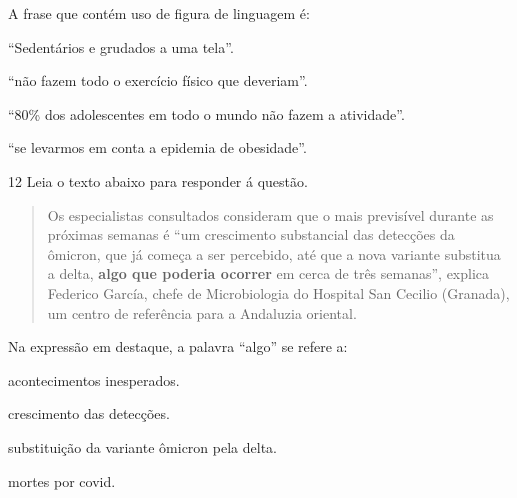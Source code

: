 
A frase que contém uso de figura de linguagem é:

\begin{escolha}
    
    \item ``Sedentários e grudados a uma tela''.
    
    \item ``não fazem todo o exercício físico que deveriam''.
    
    \item ``80\% dos adolescentes em todo o mundo não fazem a atividade''.
    
    \item ``se levarmos em conta a epidemia de obesidade''.

\end{escolha}

\num{12} Leia o texto abaixo para responder á questão.

\begin{quote}

Os especialistas consultados consideram que o mais previsível durante as
próximas semanas é ``um crescimento substancial das detecções da
ômicron, que já começa a ser percebido, até que a nova variante
substitua a delta, \textbf{algo que poderia ocorrer} em cerca de três
semanas'', explica Federico García, chefe de Microbiologia do Hospital
San Cecilio (Granada), um centro de referência para a Andaluzia
oriental.

\end{quote}


Na expressão em destaque, a palavra ``algo'' se refere a:

\begin{escolha}
  
  \item acontecimentos inesperados.
  
  \item crescimento das detecções.
  
  \item substituição da variante ômicron pela delta.
  
  \item mortes por covid.

\end{escolha}

